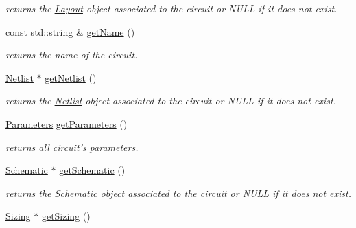 \begin{DoxyCompactItemize}
\begin{DoxyCompactList}\small\item\em returns the \hyperlink{class_open_chams_1_1_layout}{Layout} object associated to the circuit or N\-U\-L\-L if it does not exist. \end{DoxyCompactList}\item 
\hypertarget{class_open_chams_1_1_circuit_a2858c0c4e8b5108f041237cf5a802029}{const std\-::string \& \hyperlink{class_open_chams_1_1_circuit_a2858c0c4e8b5108f041237cf5a802029}{get\-Name} ()}\label{class_open_chams_1_1_circuit_a2858c0c4e8b5108f041237cf5a802029}

\begin{DoxyCompactList}\small\item\em returns the name of the circuit. \end{DoxyCompactList}\item 
\hypertarget{class_open_chams_1_1_circuit_a4085d6a7b6958ffdd7ab5df7e6d6e53f}{\hyperlink{class_open_chams_1_1_netlist}{Netlist} $\ast$ \hyperlink{class_open_chams_1_1_circuit_a4085d6a7b6958ffdd7ab5df7e6d6e53f}{get\-Netlist} ()}\label{class_open_chams_1_1_circuit_a4085d6a7b6958ffdd7ab5df7e6d6e53f}

\begin{DoxyCompactList}\small\item\em returns the \hyperlink{class_open_chams_1_1_netlist}{Netlist} object associated to the circuit or N\-U\-L\-L if it does not exist. \end{DoxyCompactList}\item 
\hypertarget{class_open_chams_1_1_circuit_a2e51ad4344607fc279c5c8cda4edae02}{\hyperlink{class_open_chams_1_1_parameters}{Parameters} \hyperlink{class_open_chams_1_1_circuit_a2e51ad4344607fc279c5c8cda4edae02}{get\-Parameters} ()}\label{class_open_chams_1_1_circuit_a2e51ad4344607fc279c5c8cda4edae02}

\begin{DoxyCompactList}\small\item\em returns all circuit's parameters. \end{DoxyCompactList}\item 
\hypertarget{class_open_chams_1_1_circuit_af6f967a5685ac92fe760f4eb95c8c51f}{\hyperlink{class_open_chams_1_1_schematic}{Schematic} $\ast$ \hyperlink{class_open_chams_1_1_circuit_af6f967a5685ac92fe760f4eb95c8c51f}{get\-Schematic} ()}\label{class_open_chams_1_1_circuit_af6f967a5685ac92fe760f4eb95c8c51f}

\begin{DoxyCompactList}\small\item\em returns the \hyperlink{class_open_chams_1_1_schematic}{Schematic} object associated to the circuit or N\-U\-L\-L if it does not exist. \end{DoxyCompactList}\item 
\hypertarget{class_open_chams_1_1_circuit_a0ce52bc8747f684ec0123faa8ff97b6d}{\hyperlink{class_open_chams_1_1_sizing}{Sizing} $\ast$ \hyperlink{class_open_chams_1_1_circuit_a0ce52bc8747f684ec0123faa8ff97b6d}{get\-Sizing} ()}\label{class_open_chams_1_1_circuit_a0ce52bc8747f684ec0123faa8ff97b6d}


\end{DoxyCompactItemize}
